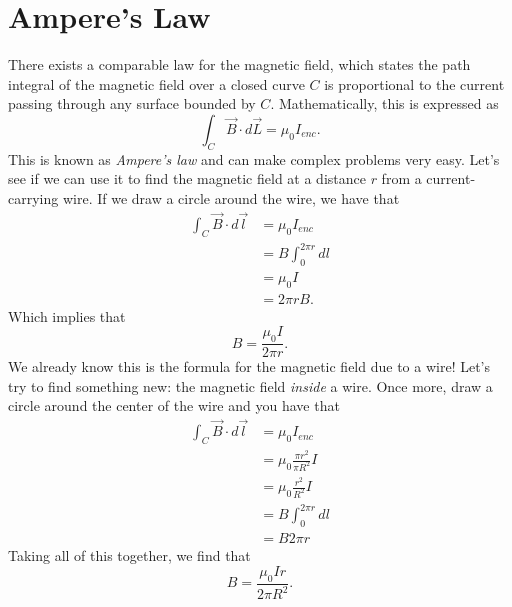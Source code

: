 \documentclass[nobib]{tufte-handout}
\begin{document}
\section{Ampere's Law}
There exists a comparable law for the magnetic field, which states 
the path integral of the magnetic field over a
closed curve $C$ is proportional to the current
passing through any surface bounded by $C$. 
Mathematically, this is expressed as
\[\int_C \vec{B} \cdot d\vec{L} = \mu_0 I_{enc}. \]
This is known as \emph{Ampere's law} and can make 
complex problems very easy. Let's see if we can use it 
to find the magnetic field at a distance $r$ from a current-carrying wire. 
If we draw a circle around the wire, 
we have that 
\begin{align*}
    \int_C \vec{B} \cdot d\vec{l} &= \mu_0 I_{enc} \\
    &= B \int_{0}^{2\pi r} dl \\
    &= \mu_0 I \\
    &= 2 \pi rB.
\end{align*}
Which implies that 
\[B = \frac{\mu_0 I}{2 \pi r}.\]
We already know this is the formula for the magnetic field 
due to a wire! Let's try to find something 
new: the magnetic field \emph{inside} 
a wire. Once more, draw a circle around the 
center of the wire and you have that 
\begin{align*}
    \int_C \vec{B} \cdot d\vec{l} &= \mu_0 I_{enc} \\
    &= \mu_0 \frac{\pi r^2}{\pi R^2} I \\
    &= \mu_0 \frac{r^2}{R^2} I \\
    &= B \int_{0}^{2\pi r} dl \\
    &= B 2\pi r 
\end{align*}
Taking all of this together, 
we find that 
\[B = \frac{\mu_0 I r}{2\pi R^2}.\]
\end{document}
